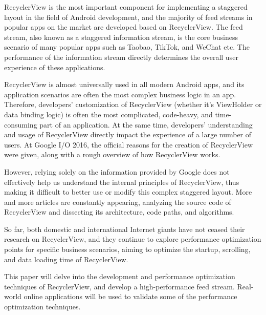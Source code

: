 RecyclerView is the most important component for implementing a staggered layout in the field of Android development, and the majority of feed streams in popular apps on the market are developed based on RecyclerView. The feed stream, also known as a staggered information stream, is the core business scenario of many popular apps such as Taobao, TikTok, and WeChat etc. The performance of the information stream directly determines the overall user experience of these applications.

RecyclerView is almost universally used in all modern Android apps, and its application scenarios are often the most complex business logic in an app. Therefore, developers' customization of RecyclerView (whether it's ViewHolder or data binding logic) is often the most complicated, code-heavy, and time-consuming part of an application. At the same time, developers' understanding and usage of RecyclerView directly impact the experience of a large number of users. At Google I/O 2016, the official reasons for the creation of RecyclerView were given, along with a rough overview of how RecyclerView works.

However, relying solely on the information provided by Google does not effectively help us understand the internal principles of RecyclerView, thus making it difficult to better use or modify this complex staggered layout. More and more articles are constantly appearing, analyzing the source code of RecyclerView and dissecting its architecture, code paths, and algorithms.

So far, both domestic and international Internet giants have not ceased their research on RecyclerView, and they continue to explore performance optimization points for specific business scenarios, aiming to optimize the startup, scrolling, and data loading time of RecyclerView.

This paper will delve into the development and performance optimization techniques of RecyclerView, and develop a high-performance feed stream. Real-world online applications will be used to validate some of the performance optimization techniques.